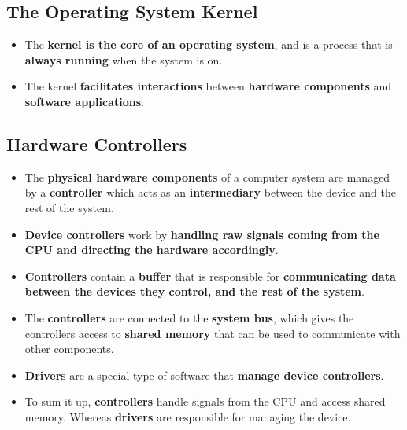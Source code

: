 \documentclass[16pt]{article}
\begin{document}
    \subsection*{The Operating System Kernel}
    \begin{itemize}
        \item The \textbf{kernel is the core of an operating system}, and is a process that is \textbf{always running} when the system is on.
        \item The kernel \textbf{facilitates interactions} between \textbf{hardware components} and \textbf{software applications}.
    \end{itemize}

    \subsection*{Hardware Controllers}
    \begin{itemize}
        \item The \textbf{physical hardware components} of a computer system are managed by a \textbf{controller} which acts as an \textbf{intermediary} between the device and the rest of the system. 
        \item \textbf{Device controllers} work by \textbf{handling raw signals coming from the CPU and directing the hardware accordingly}.
        \item \textbf{Controllers} contain a \textbf{buffer} that is responsible for \textbf{communicating data between the devices they control, and the rest of the system}.
        \item The \textbf{controllers} are connected to the \textbf{system bus}, which gives the controllers access to \textbf{shared memory} that can be used to communicate with other components.
        \item \textbf{Drivers} are a special type of software that \textbf{manage device controllers}.
        \item To sum it up, \textbf{controllers} handle signals from the CPU and access shared memory. Whereas \textbf{drivers} are responsible for managing the device.
    \end{itemize}

    \section*{}
\end{document}
